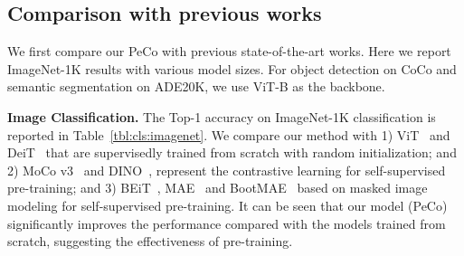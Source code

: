 \documentclass[letterpaper]{article} \usepackage{aaai23}  \usepackage{times}  \usepackage{helvet}  \usepackage{courier}  \usepackage[hyphens]{url}  \usepackage{graphicx} \urlstyle{rm} \def\UrlFont{\rm}  \usepackage{natbib}  \usepackage{caption} \frenchspacing  \setlength{\pdfpagewidth}{8.5in}  \setlength{\pdfpageheight}{11in}  \usepackage{algorithm}
\begin{document}
\begin{table}[t]
\centering
\small
{}
\caption{Semantic segmentation mIoU (\%) comparison on ADE20K and object detection and instance segmentation comparison in terms of box AP () and mask AP () on COCO. The backbones for all the methods are the ViT-B.}

\label{tab:ade20coco}

\end{table}



\subsection{Comparison with previous works}
We first compare our PeCo with previous state-of-the-art works. 
Here we report ImageNet-1K results with various model sizes. For object detection on CoCo and semantic segmentation on ADE20K, we use ViT-B as the backbone.

\noindent \textbf{Image Classification.}
The Top-1 accuracy on ImageNet-1K classification is reported in Table~\ref{tbl:cls:imagenet}. 
We compare our method with 1) ViT~\cite{dosovitskiy2020image} and DeiT~\cite{touvron2021training} that are supervisedly trained from scratch with random initialization;
and 2) MoCo v3~\cite{chen2021empirical} and DINO~\cite{caron2021emerging}, represent the contrastive learning for self-supervised pre-training;
and 3) BEiT~\cite{bao2021beit}, MAE~\cite{he2021masked} and BootMAE~\cite{dong2022bootstrapped}  based on masked image modeling for self-supervised pre-training.
It can be seen that our model (PeCo) significantly improves the performance compared with the models trained from scratch, suggesting the effectiveness of pre-training.
\end{document}
